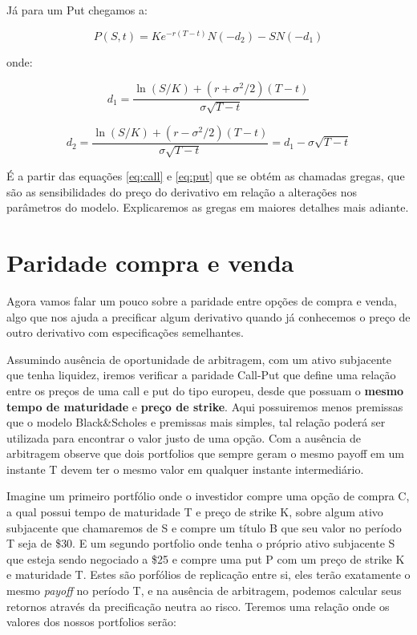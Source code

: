 \documentclass[]{book}
\begin{document}
Já para um Put chegamos a:

\begin{equation}
P(S,t)=Ke^{-r(T-t)}N(-d_{2})-SN(-d_{1})
\label{eq:put}
\end{equation}

onde:

\begin{equation}d_{1}={\frac {\ln(S/K)+(r+\sigma ^{2}/2)(T-t)}{\sigma {\sqrt {T-t}}}}
\label{eq:d1}
\end{equation}

\begin{equation}d_{2}={\frac {\ln(S/K)+(r-\sigma ^{2}/2)(T-t)}{\sigma {\sqrt {T-t}}}}=d_1-\sigma\sqrt{T-t}
\label{eq:d2}
\end{equation}

É a partir das equações \eqref{eq:call} e \eqref{eq:put} que se obtém as
chamadas gregas, que são as sensibilidades do preço do derivativo em
relação a alterações nos parâmetros do modelo. Explicaremos as gregas em
maiores detalhes mais adiante.

\section{Paridade compra e venda}\label{putcallparity}

Agora vamos falar um pouco sobre a paridade entre opções de compra e
venda, algo que nos ajuda a precificar algum derivativo quando já
conhecemos o preço de outro derivativo com especificações semelhantes.

Assumindo ausência de oportunidade de arbitragem, com um ativo
subjacente que tenha liquidez, iremos verificar a paridade Call-Put que
define uma relação entre os preços de uma call e put do tipo europeu,
desde que possuam o \textbf{mesmo tempo de maturidade} e \textbf{preço
de strike}. Aqui possuiremos menos premissas que o modelo Black\&Scholes
e premissas mais simples, tal relação poderá ser utilizada para
encontrar o valor justo de uma opção. Com a ausência de arbitragem
observe que dois portfolios que sempre geram o mesmo payoff em um
instante T devem ter o mesmo valor em qualquer instante intermediário.

Imagine um primeiro portfólio onde o investidor compre uma opção de
compra C, a qual possui tempo de maturidade T e preço de strike K, sobre
algum ativo subjacente que chamaremos de S e compre um título B que seu
valor no período T seja de {\$}30. E um segundo portfolio onde tenha o
próprio ativo subjacente S que esteja sendo negociado a {\$}25 e compre
uma put P com um preço de strike K e maturidade T. Estes são porfólios
de replicação entre si, eles terão exatamente o mesmo \emph{payoff} no
período T, e na ausência de arbitragem, podemos calcular seus retornos
através da precificação neutra ao risco. Teremos uma relação onde os
valores dos nossos portfolios serão:
\end{document}
